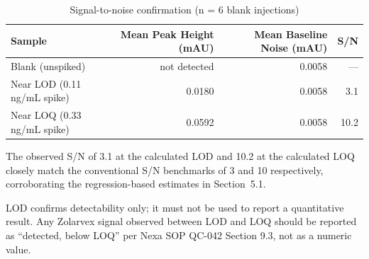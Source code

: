 \begin{table}[h!]
\centering
\small
\caption{Signal-to-noise confirmation (n = 6 blank injections)}
\label{tab:sn}
\begin{tabularx}{\linewidth}{@{}X r r r@{}}
\toprule
\textbf{Sample} & \textbf{Mean Peak Height (mAU)} & \textbf{Mean Baseline Noise (mAU)} & \textbf{S/N} \\
\midrule
Blank (unspiked) & not detected & 0.0058 & --- \\
Near LOD (0.11 ng/mL spike) & 0.0180 & 0.0058 & 3.1 \\
Near LOQ (0.33 ng/mL spike) & 0.0592 & 0.0058 & 10.2 \\
\bottomrule
\end{tabularx}
\end{table}

The observed S/N of 3.1 at the calculated LOD and 10.2 at the calculated LOQ closely
match the conventional S/N benchmarks of 3 and 10 respectively, corroborating the
regression-based estimates in Section~5.1.

\begin{tcolorbox}[notebox, title={\faExclamationTriangle\ Interpretation Note}]
\footnotesize
LOD confirms detectability only; it must not be used to report a quantitative result.
Any Zolarvex signal observed between LOD and LOQ should be reported as
``detected, below LOQ'' per Nexa SOP QC-042 Section 9.3, not as a numeric value.
\end{tcolorbox}
